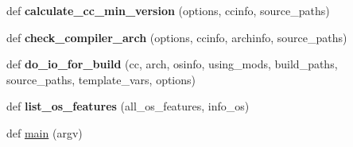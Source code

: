 \begin{DoxyCompactItemize}
\item 
\mbox{\label{namespaceconfigure_ae6783814b71a4c2f5d50e5f4bf02c7f3}} 
def {\bfseries calculate\+\_\+cc\+\_\+min\+\_\+version} (options, ccinfo, source\+\_\+paths)
\item 
\mbox{\label{namespaceconfigure_ac5cf3c06462f4357d29105d6f607935c}} 
def {\bfseries check\+\_\+compiler\+\_\+arch} (options, ccinfo, archinfo, source\+\_\+paths)
\item 
\mbox{\label{namespaceconfigure_ac041bd72f05c2b3d87f1e3102321d5b3}} 
def {\bfseries do\+\_\+io\+\_\+for\+\_\+build} (cc, arch, osinfo, using\+\_\+mods, build\+\_\+paths, source\+\_\+paths, template\+\_\+vars, options)
\item 
\mbox{\label{namespaceconfigure_ab8fee6da42faf21d6acc86bdef01f06e}} 
def {\bfseries list\+\_\+os\+\_\+features} (all\+\_\+os\+\_\+features, info\+\_\+os)
\item 
def \mbox{\hyperlink{namespaceconfigure_ab36af005492375c1144a850d45fb1a42}{main}} (argv)
\end{DoxyCompactItemize}
